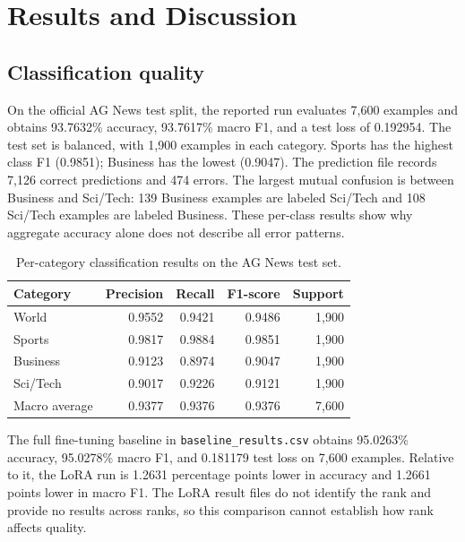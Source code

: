\section{Results and Discussion}
\subsection{Classification quality}

On the official AG News test split, the reported run evaluates 7,600
examples and obtains 93.7632\% accuracy, 93.7617\% macro F1, and a test
loss of 0.192954. The test set is balanced, with 1,900 examples in each
category. Sports has the highest class F1 (0.9851); Business has the
lowest (0.9047). The prediction file records 7,126 correct predictions
and 474 errors. The largest mutual confusion is between Business and
Sci/Tech: 139 Business examples are labeled Sci/Tech and 108 Sci/Tech
examples are labeled Business. These per-class results show why aggregate
accuracy alone does not describe all error patterns.

\begin{table}[htbp]
\centering
\small
\caption{Per-category classification results on the AG News test set.}
\label{tab:classification}
\begin{tabular}{lrrrr}
\toprule
Category & Precision & Recall & F1-score & Support \\
\midrule
World & 0.9552 & 0.9421 & 0.9486 & 1,900 \\
Sports & 0.9817 & 0.9884 & 0.9851 & 1,900 \\
Business & 0.9123 & 0.8974 & 0.9047 & 1,900 \\
Sci/Tech & 0.9017 & 0.9226 & 0.9121 & 1,900 \\
Macro average & 0.9377 & 0.9376 & 0.9376 & 7,600 \\
\bottomrule
\end{tabular}
\end{table}

The full fine-tuning baseline in \texttt{baseline\_results.csv} obtains
95.0263\% accuracy, 95.0278\% macro F1, and 0.181179 test loss on
7,600 examples. Relative to it, the LoRA run is 1.2631 percentage
points lower in accuracy and 1.2661 points lower in macro F1. The LoRA
result files do not identify the rank and provide no results across
ranks, so this comparison cannot establish how rank affects quality.

